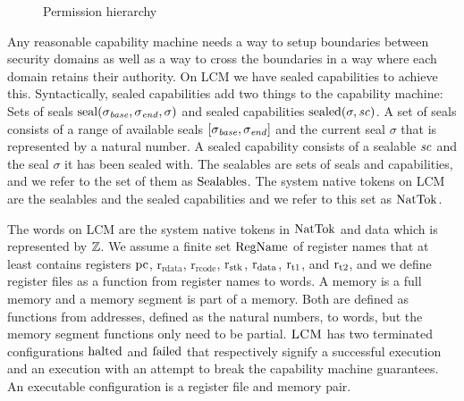 \documentclass[acmsmall,review,anonymous]{acmart}\settopmatter{printfolios=true,printccs=false,printacmref=false}
\renewcommand{\RegName}{\shareddom{RegName}}
\renewcommand{\SealableCaps}{\shareddom{Sealables}}
\renewcommand{\Cap}{\shareddom{NatTok}}
\renewcommand{\rretc}{\mathrm{r}_{\mathrm{rcode}}}
\renewcommand{\rretd}{\mathrm{r}_{\mathrm{rdata}}}
\newcommand{\trgcm}{\textsc{LCM}}
\begin{document}
\begin{wrapfigure}{r}{0.33\linewidth}
  \centering

  \caption{Permission hierarchy}
  \label{fig:perm-hier}
\end{wrapfigure}

Any reasonable capability machine needs a way to setup boundaries between security domains as well as a way to cross the boundaries in a way where each domain retains their authority.
On \trgcm{} we have sealed capabilities to achieve this.
Syntactically, sealed capabilities add two things to the capability machine: Sets of seals $\mathrm{seal}(\sigma_{\mathit{base}},\sigma_{\mathit{end}},\sigma)$ and sealed capabilities $\mathrm{sealed}(\sigma,\mathit{sc})$.
A set of seals consists of a range of available seals $[\sigma_{\mathit{base}},\sigma_{\mathit{end}}]$ and the current seal $\sigma$ that is represented by a natural number.
A sealed capability consists of a sealable $\mathit{sc}$ and the seal $\sigma$ it has been sealed with.
The sealables are sets of seals and capabilities, and we refer to the set of them as $\SealableCaps$.
The system native tokens on \trgcm{} are the sealables and the sealed capabilities and we refer to this set as $\Cap$.

The words on \trgcm{} are the system native tokens in $\Cap$ and data which is represented by $\mathbb{Z}$.
We assume a finite set $\RegName$ of register names that at least contains registers $\mathrm{pc}$, $\rretd$, $\rretc$, $\mathrm{r}_\mathrm{stk}$, $\mathrm{r}_\mathrm{data}$, $\mathrm{r}_\mathrm{t1}$, and $\mathrm{r}_\mathrm{t2}$, and we define register files as a function from register names to words.
A memory is a full memory and a memory segment is part of a memory.
Both are defined as functions from addresses, defined as the natural numbers, to words, but the memory segment functions only need to be partial.
$\trgcm{}$ has two terminated configurations $\mathrm{halted}$ and $\mathrm{failed}$ that respectively signify a successful execution and an execution with an attempt to break the capability machine guarantees.
An executable configuration is a register file and memory pair. 
\end{document}
